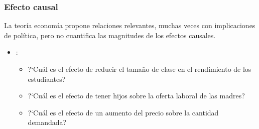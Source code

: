\documentclass[t, compress, spanish, aspectratio=169]{beamer}
\newcommand{\term}[1]{\structure{\textbf{#1}}} %
\begin{document}
    \begin{frame}
        \frametitle{Efecto causal}
        La teor\'ia econom\'ia propone relaciones relevantes, muchas veces con implicaciones de pol\'itica, pero no cuantifica las magnitudes de los efectos causales.
        \begin{itemize}
            \item \term{Ejemplos}:
            \begin{itemize}
                \item ?`Cu\'al es el efecto de reducir el tama\~no de clase en el rendimiento de los estudiantes?
                \item ?`Cu\'al es el efecto de tener hijos sobre la oferta laboral de las madres?
                \item ?`Cu\'al es el efecto de un aumento del precio sobre la cantidad demandada?

\end{itemize}
\end{itemize}
\end{frame}
\end{document}
